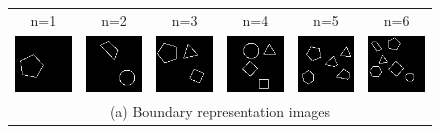 \documentclass[letterpaper]{article} %
\begin{document}
\begin{figure}[!t]%
\centering
\footnotesize
\begin{tabular}{cccccc}
\multicolumn{1}{c}{n=1} \hspace{-12pt} &
\multicolumn{1}{c}{n=2} \hspace{-12pt} &
\multicolumn{1}{c}{n=3} \hspace{-12pt} &
\multicolumn{1}{c}{n=4} \hspace{-12pt} &
\multicolumn{1}{c}{n=5} \hspace{-12pt} &
\multicolumn{1}{c}{n=6} \\

\multicolumn{1}{c}{\includegraphics[width=0.125\columnwidth]{images/edges_1.png}} \hspace{-12pt} &  \multicolumn{1}{c}{\includegraphics[width=0.125\columnwidth]{images/edges_2.png}} \hspace{-12pt} & \multicolumn{1}{c}{\includegraphics[width=0.125\columnwidth]{images/edges_3.png}} \hspace{-12pt} & \multicolumn{1}{c}{\includegraphics[width=0.125\columnwidth]{images/edges_4.png}} \hspace{-12pt} & \multicolumn{1}{c}{\includegraphics[width=0.125\columnwidth]{images/edges_5.png}} \hspace{-12pt} & \multicolumn{1}{c}{\includegraphics[width=0.125\columnwidth]{images/edges_6.png}} \\
\multicolumn{6}{c}{(a) Boundary representation images} \\


\end{tabular}
\end{figure}
\end{document}
